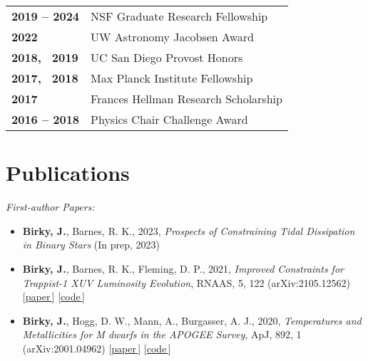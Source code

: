 \documentclass[a4,10.5pt]{article}
\newcommand{\hskills}[1]{
\textbf{\bfseries #1} }
\let\orighref\href
\renewcommand{\href}[2]{\orighref{#1}{#2\,\scriptsize\faExternalLink}}
\begin{document}
\begin{tabular}[t]{ p{9em} p{50em}}
\hskills{2019 -- 2024} & NSF Graduate Research Fellowship \\ %
\hskills{2022} & UW Astronomy Jacobsen Award  \\
\hskills{2018, \, 2019} & UC San Diego Provost Honors  \\ %
\hskills{2017, \, 2018} & Max Planck Institute Fellowship \\ %
\hskills{2017} & Frances Hellman Research Scholarship \\  %
\hskills{2016 -- 2018} & Physics Chair Challenge Award \\ %
\end{tabular} 


\section{Publications } 

\textsl{First-author Papers:} 
\begin{itemize}[itemsep=0pt]
    \item \textbf{Birky, J.}, Barnes, R. K., 2023, \textsl{Prospects of Constraining Tidal Dissipation in Binary Stars} (In prep, 2023)
    \item \textbf{Birky, J.}, Barnes, R. K., Fleming, D. P., 2021, \textsl{Improved Constraints for Trappist-1 XUV Luminosity Evolution}, RNAAS, 5, 122 (arXiv:2105.12562)  [\href{https://iopscience.iop.org/article/10.3847/2515-5172/ac034c}{paper}] [\href{https://github.com/jbirky/trappist_xuv}{code}]
    \item \textbf{Birky, J.}, Hogg, D. W., Mann, A., Burgasser, A. J., 2020, \textsl{Temperatures and Metallicities for M dwarfs in the APOGEE Survey}, ApJ, 892, 1 (arXiv:2001.04962) [\href{https://iopscience.iop.org/article/10.3847/1538-4357/ab7004}{paper}] [\href{https://github.com/jbirky/Mdwarf_project}{code}]
\end{itemize}
\end{document}
